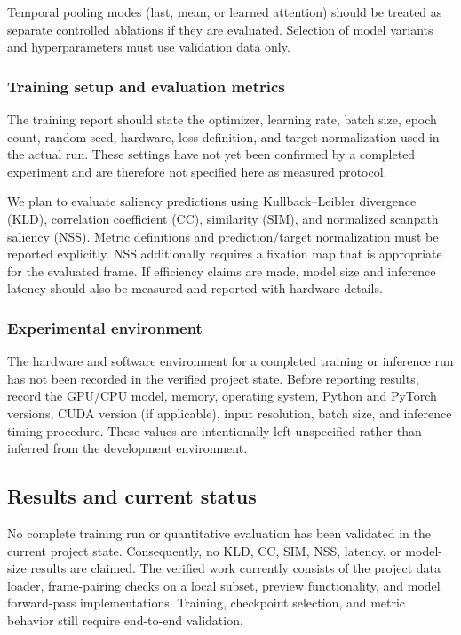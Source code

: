 \documentclass[10pt,twocolumn,letterpaper]{article}
\begin{document}
Temporal pooling modes (last, mean, or learned attention) should be treated as
separate controlled ablations if they are evaluated. Selection of model
variants and hyperparameters must use validation data only.

\subsubsection{Training setup and evaluation metrics}

The training report should state the optimizer, learning rate, batch size,
epoch count, random seed, hardware, loss definition, and target
normalization used in the actual run. These settings have not yet been
confirmed by a completed experiment and are therefore not specified here as
measured protocol.

We plan to evaluate saliency predictions using Kullback--Leibler divergence
(KLD), correlation coefficient (CC), similarity (SIM), and normalized
scanpath saliency (NSS). Metric definitions and prediction/target
normalization must be reported explicitly. NSS additionally requires a
fixation map that is appropriate for the evaluated frame. If efficiency
claims are made, model size and inference latency should also be measured
and reported with hardware details.

\subsubsection{Experimental environment}

The hardware and software environment for a completed training or inference
run has not been recorded in the verified project state. Before reporting
results, record the GPU/CPU model, memory, operating system, Python and
PyTorch versions, CUDA version (if applicable), input resolution, batch size,
and inference timing procedure. These values are intentionally left
unspecified rather than inferred from the development environment.

\subsection{Results and current status}
\label{sec:results}

No complete training run or quantitative evaluation has been validated in
the current project state. Consequently, no KLD, CC, SIM, NSS, latency, or
model-size results are claimed. The verified work currently consists of the
project data loader, frame-pairing checks on a local subset, preview
functionality, and model forward-pass implementations. Training, checkpoint
selection, and metric behavior still require end-to-end validation.
\end{document}
